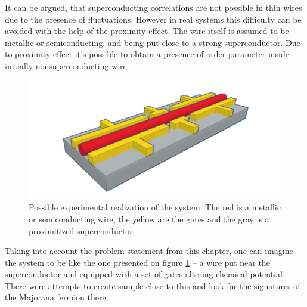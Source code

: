 It can be argued, that superconducting correlations are not possible in thin wires due to the presence of fluctuations. However in real systems this difficulty can be avoided with the help of the proximity effect. The wire itself is assumed to be metallic or semiconducting, and being put close to a strong superconductor. Due to proximity effect it's possible to obtain a presence of order parameter inside initially nonsuperconducting wire. 

\begin{figure}
	\centering
	\includegraphics[width=0.7\linewidth]{images/like_real}
	\caption{Possible experimental realization of the system. The red is a metallic or semiconducting wire, the yellow are the gates and the gray is a proximitized superconductor }
	\label{fig:likereal}
\end{figure}

Taking into account the problem statement from this chapter, one can imagine the system to be like the one presented on figure \ref{fig:likereal} -- a wire put near the superconductor and equipped with a set of gates altering chemical potential. There were attempts \cite{quintized_conductance_Zhang} to create sample close to this and look for the signatures of the Majorana fermion there. 
